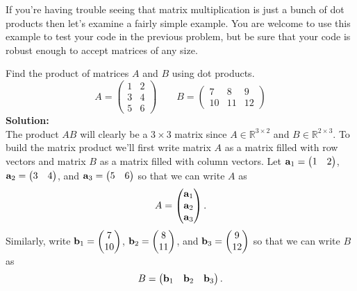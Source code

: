 If you're having trouble seeing that matrix multiplication is just a bunch of dot products
then let's examine a fairly simple example.  You are welcome to use this example to test
your code in the previous problem, but be sure that your code is robust enough to accept
matrices of any size.
\begin{example}
    Find the product of matrices $A$ and $B$ using dot products.
    \[ A = \begin{pmatrix} 1 & 2 \\ 3 & 4 \\ 5 & 6 \end{pmatrix} \qquad B =
    \begin{pmatrix} 7 & 8 & 9 \\ 10 & 11 & 12 \end{pmatrix} \]
    {\bf Solution:} \\
    The product $AB$ will clearly be a $3 \times 3$ matrix since $A \in \mathbb{R}^{3
    \times 2}$ and $B \in \mathbb{R}^{2\times3}$.  To build the matrix product we'll first
    write matrix $A$ as a matrix filled with row vectors and matrix $B$ as a
    matrix filled with column vectors.  Let ${\bf a}_1 = \begin{pmatrix} 1 & 2
    \end{pmatrix}$, ${\bf a}_2 = \begin{pmatrix} 3 & 4 \end{pmatrix}$,  and ${\bf a}_3 =
    \begin{pmatrix} 5 & 6 \end{pmatrix}$ so that we can write $A$ as
    \[ A = \begin{pmatrix} {\bf a}_1 \\ {\bf a}_2 \\ {\bf a}_3
    \end{pmatrix}. \]
    Similarly, write ${\bf b}_1 = \begin{pmatrix} 7\\10\end{pmatrix}$, ${\bf b}_2 =
    \begin{pmatrix} 8 \\ 11\end{pmatrix}$, and ${\bf b}_3 = \begin{pmatrix}
        9\\12\end{pmatrix}$ so that we can write $B$ as
    \[ B = \begin{pmatrix} {\bf b}_1 & {\bf b}_2 & {\bf b}_3 \end{pmatrix}. \]


\end{example}
